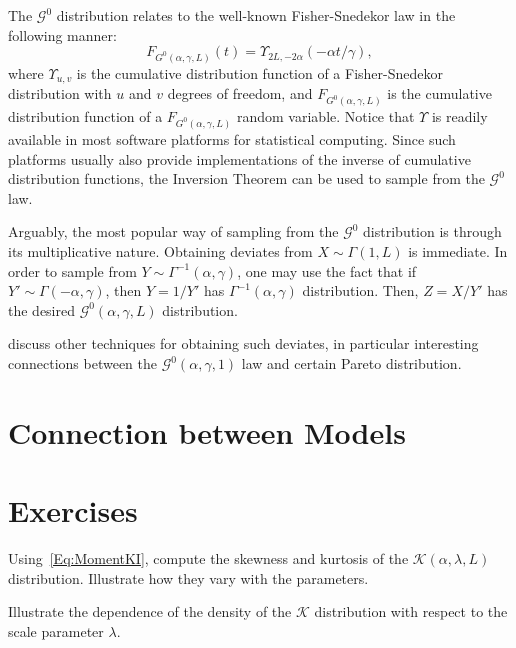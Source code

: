 The $\mathcal G^0$ distribution relates to the well-known Fisher-Snedekor law in the following manner:
\begin{equation}
F_{G^0(\alpha,\gamma,L)}(t) = \Upsilon_{2L,- 2\alpha}(- \alpha t/\gamma),
\end{equation}
where $\Upsilon_{u,v}$ is the cumulative distribution function of a Fisher-Snedekor distribution with $u$ and $v$ degrees of freedom, and $F_{G^0(\alpha,\gamma,L)}$ is the cumulative distribution function of a $F_{G^0(\alpha,\gamma,L)}$ random variable.
Notice that $\Upsilon$ is readily available in most software platforms for statistical computing.
Since such platforms usually also provide implementations of the inverse of cumulative distribution functions, the Inversion Theorem can be used to sample from the $\mathcal G^0$ law.

Arguably, the most popular way of sampling from the $\mathcal G^0$ distribution is through its multiplicative nature.
Obtaining deviates from $X\sim\Gamma(1,L)$ is immediate.
In order to sample from $Y\sim\Gamma^{-1}(\alpha,\gamma)$, one may use the fact that if $Y'\sim\Gamma(-\alpha,\gamma)$, then $Y=1/Y'$ has $\Gamma^{-1}(\alpha,\gamma)$ distribution.
Then, $Z=X/Y'$ has the desired $\mathcal G^0(\alpha,\gamma,L)$ distribution.

\citet{SamplingfromtheGI0Distribution2018} discuss other techniques for obtaining such deviates, in particular interesting connections between the $\mathcal G^0(\alpha,\gamma,1)$ law and certain Pareto distribution.

\section{Connection between Models}

\section*{Exercises}

\begin{exer}
Using~\eqref{Eq:MomentKI}, compute the skewness and kurtosis of the $\mathcal K(\alpha,\lambda,L)$ distribution.
Illustrate how they vary with the parameters.
\end{exer}

\begin{exer}
Illustrate the dependence of the density of the $\mathcal K$ distribution with respect to the scale parameter $\lambda$.
\end{exer}

